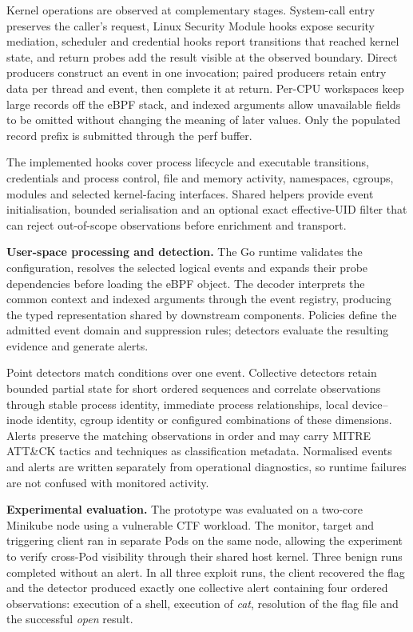 Kernel operations are observed at complementary stages. System-call entry
preserves the caller's request, Linux Security Module hooks expose security
mediation, scheduler and credential hooks report transitions that reached
kernel state, and return probes add the result visible at the observed
boundary. Direct producers construct an event in one invocation; paired
producers retain entry data per thread and event, then complete it at return.
Per-CPU workspaces keep large records off the eBPF stack, and indexed arguments
allow unavailable fields to be omitted without changing the meaning of later
values. Only the populated record prefix is submitted through the perf buffer.

The implemented hooks cover process lifecycle and executable transitions,
credentials and process control, file and memory activity, namespaces,
cgroups, modules and selected kernel-facing interfaces. Shared helpers provide event
initialisation, bounded serialisation and an optional exact effective-UID
filter that can reject out-of-scope observations before enrichment and
transport.

\enlargethispage{\baselineskip}


\noindent\textbf{User-space processing and detection.}
The Go runtime validates the configuration, resolves the selected logical
events and expands their probe dependencies before loading the eBPF object.
The decoder interprets the common context and indexed arguments through the
event registry, producing the typed representation shared by downstream
components. Policies define the admitted event domain and suppression rules;
detectors evaluate the resulting evidence and generate alerts.

Point detectors match conditions over one event. Collective detectors retain
bounded partial state for short ordered sequences and correlate observations
through stable process identity, immediate process relationships, local
device--inode identity, cgroup identity or configured combinations of these
dimensions. Alerts preserve the matching observations in order and may carry
MITRE ATT\&CK tactics and techniques as classification metadata. Normalised
events and alerts are written separately from operational diagnostics, so
runtime failures are not confused with monitored activity.

\medskip
\noindent\textbf{Experimental evaluation.}
The prototype was evaluated on a two-core Minikube node using a vulnerable 
CTF workload. The monitor, target and triggering client ran in
separate Pods on the same node, allowing the experiment to verify cross-Pod
visibility through their shared host kernel. Three benign runs completed
without an alert. In all three exploit runs, the client recovered the 
flag and the detector produced exactly one collective alert
containing four ordered observations: execution of a shell, execution of
\emph{cat}, resolution of the flag file and the successful \emph{open} result.

